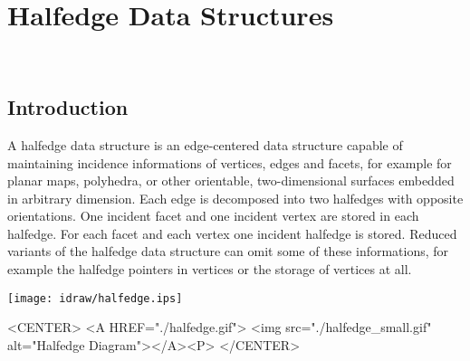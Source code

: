 
\ccParDims

\chapter{Halfedge Data Structures}
\label{chapterHds}
\\


\section{Introduction}

A halfedge data structure is an edge-centered data structure capable
of maintaining incidence informations of vertices, edges and facets,
for example for planar maps, polyhedra, or other orientable,
two-dimensional surfaces embedded in arbitrary dimension. Each edge is
decomposed into two halfedges with opposite orientations. One incident
facet and one incident vertex are stored in each halfedge.  For each
facet and each vertex one incident halfedge is stored.  Reduced
variants of the halfedge data structure can omit some of these
informations, for example the halfedge pointers in vertices or the
storage of vertices at all.

\begin{ccTexOnly}
    \vspace{-4mm}
    \begin{center}
      \parbox{0.4\textwidth}{%
          \texttt{[image: idraw/halfedge.ips]}%
      }
    \end{center}
    \vspace{-3mm}
\end{ccTexOnly}

\begin{ccHtmlOnly}
    <CENTER>
    <A HREF="./halfedge.gif">
        <img src="./halfedge_small.gif" alt="Halfedge Diagram"></A><P>
    </CENTER>
\end{ccHtmlOnly}

